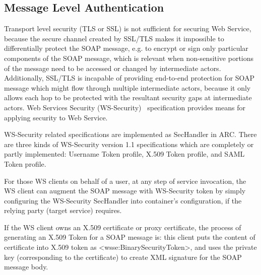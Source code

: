 \documentclass[twocolumn]{svjour3}         %
\begin{document}
\subsection{Message Level Authentication}
\label{sec:msgauthn}
Transport level security (TLS or SSL) is not sufficient for securing Web Service, because the secure channel created by SSL/TLS makes it impossible to differentially protect the SOAP message, e.g. to encrypt or sign only particular components of the SOAP message, which is relevant when non-sensitive portions of the message need to be accessed or changed by intermediate actors. Additionally, SSL/TLS is incapable of providing end-to-end protection for SOAP message which might flow through multiple intermediate actors, because it only allows each hop to be protected with the resultant security gaps at intermediate actors. Web Services Security (WS-Security)~\cite{WSSeclink} specification provides means for applying security to Web Service.

WS-Security related specifications are implemented as SecHandler in ARC. There are three kinds of WS-Security version 1.1 specifications which are completely or partly implemented: Username Token profile, X.509 Token profile, and SAML Token profile.

For those WS clients on behalf of a user, at any step of service invocation, the WS client can augment the SOAP message with WS-Security token by simply configuring the WS-Security SecHandler into container’s configuration, if the relying party (target service) requires.

If the WS client owns an X.509 certificate or proxy certificate, the process of generating an X.509 Token for a SOAP message is: this client puts the content of certificate into X.509 token as <wsse:BinarySecurityToken>, and uses the private key (corresponding to the certificate) to create XML signature for the SOAP message body.
\end{document}
